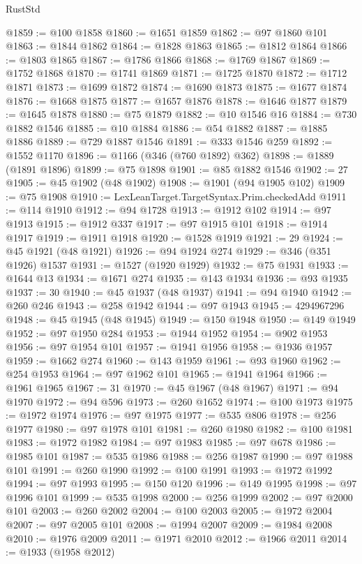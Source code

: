 \begin{lexlean}{RustStd}
\begin{coremodule}
@1859 := @100 @1858
@1860 := @1651 @1859
@1862 := @97 @1860 @101
@1863 := @1844 @1862
@1864 := @1828 @1863
@1865 := @1812 @1864
@1866 := @1803 @1865
@1867 := @1786 @1866
@1868 := @1769 @1867
@1869 := @1752 @1868
@1870 := @1741 @1869
@1871 := @1725 @1870
@1872 := @1712 @1871
@1873 := @1699 @1872
@1874 := @1690 @1873
@1875 := @1677 @1874
@1876 := @1668 @1875
@1877 := @1657 @1876
@1878 := @1646 @1877
@1879 := @1645 @1878
@1880 := @75 @1879
@1882 := @10 @1546 @16
@1884 := @730 @1882 @1546
@1885 := @10 @1884
@1886 := @54 @1882
@1887 := @1885 @1886
@1889 := @729 @1887 @1546
@1891 := @333 @1546 @259
@1892 := @1552 @1170
@1896 := @1166 (@346 (@760 @1892) @362)
@1898 := @1889 (@1891 @1896)
@1899 := @75 @1898
@1901 := @85 @1882 @1546
@1902 := 27
@1905 := @45 @1902 (@48 @1902)
@1908 := @1901 (@94 @1905 @102)
@1909 := @75 @1908
@1910 := LexLeanTarget.TargetSyntax.Prim.checkedAdd
@1911 := @114 @1910
@1912 := @94 @1728
@1913 := @1912 @102
@1914 := @97 @1913
@1915 := @1912 @337
@1917 := @97 @1915 @101
@1918 := @1914 @1917
@1919 := @1911 @1918
@1920 := @1528 @1919
@1921 := 29
@1924 := @45 @1921 (@48 @1921)
@1926 := @94 @1924 @274
@1929 := @346 (@351 @1926) @1537
@1931 := @1527 (@1920 @1929)
@1932 := @75 @1931
@1933 := @1644 @13
@1934 := @1671 @274
@1935 := @143 @1934
@1936 := @93 @1935
@1937 := 30
@1940 := @45 @1937 (@48 @1937)
@1941 := @94 @1940
@1942 := @260 @246
@1943 := @258 @1942
@1944 := @97 @1943
@1945 := 4294967296
@1948 := @45 @1945 (@48 @1945)
@1949 := @150 @1948
@1950 := @149 @1949
@1952 := @97 @1950 @284
@1953 := @1944 @1952
@1954 := @902 @1953
@1956 := @97 @1954 @101
@1957 := @1941 @1956
@1958 := @1936 @1957
@1959 := @1662 @274
@1960 := @143 @1959
@1961 := @93 @1960
@1962 := @254 @1953
@1964 := @97 @1962 @101
@1965 := @1941 @1964
@1966 := @1961 @1965
@1967 := 31
@1970 := @45 @1967 (@48 @1967)
@1971 := @94 @1970
@1972 := @94 @596
@1973 := @260 @1652
@1974 := @100 @1973
@1975 := @1972 @1974
@1976 := @97 @1975
@1977 := @535 @806
@1978 := @256 @1977
@1980 := @97 @1978 @101
@1981 := @260 @1980
@1982 := @100 @1981
@1983 := @1972 @1982
@1984 := @97 @1983
@1985 := @97 @678
@1986 := @1985 @101
@1987 := @535 @1986
@1988 := @256 @1987
@1990 := @97 @1988 @101
@1991 := @260 @1990
@1992 := @100 @1991
@1993 := @1972 @1992
@1994 := @97 @1993
@1995 := @150 @120
@1996 := @149 @1995
@1998 := @97 @1996 @101
@1999 := @535 @1998
@2000 := @256 @1999
@2002 := @97 @2000 @101
@2003 := @260 @2002
@2004 := @100 @2003
@2005 := @1972 @2004
@2007 := @97 @2005 @101
@2008 := @1994 @2007
@2009 := @1984 @2008
@2010 := @1976 @2009
@2011 := @1971 @2010
@2012 := @1966 @2011
@2014 := @1933 (@1958 @2012)

\end{coremodule}
\end{lexlean}
